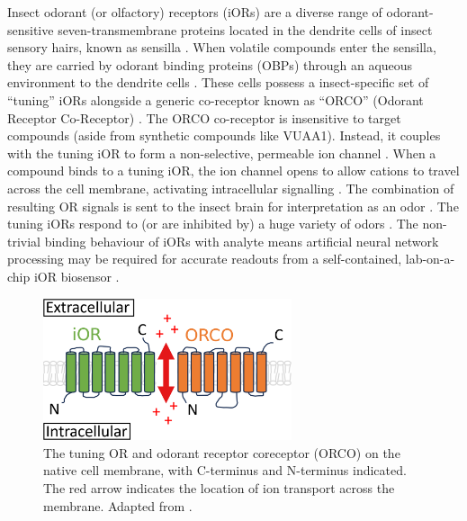 \documentclass[
  a4paper,
]{scrbook}
\begin{document}
Insect odorant (or olfactory) receptors (iORs) are a diverse range of
odorant-sensitive seven-transmembrane proteins located in the dendrite
cells of insect sensory hairs, known as sensilla
\autocite{Clyne1999,Carraher2015,Brito2016,Wicher2021}. When volatile
compounds enter the sensilla, they are carried by odorant binding
proteins (OBPs) through an aqueous environment to the dendrite cells
\autocite{Carraher2015,Brito2016,Wicher2021}. These cells possess a
insect-specific set of ``tuning'' iORs alongside a generic co-receptor
known as ``ORCO'' (Odorant Receptor Co-Receptor)
\autocite{Carraher2015,Butterwick2018,Khadka2019,Wicher2021}. The ORCO
co-receptor is insensitive to target compounds (aside from synthetic
compounds like VUAA1). Instead, it couples with the tuning iOR to form a
non-selective, permeable ion channel
\autocite{Butterwick2018,Wicher2021}. When a compound binds to a tuning
iOR, the ion channel opens to allow cations to travel across the cell
membrane, activating intracellular signalling
\autocite{Smart2008,Wicher2008,Sato2008,Carraher2015,Brito2016,Butterwick2018,Wicher2021}.
The combination of resulting OR signals is sent to the insect brain for
interpretation as an odor \autocite{Hallem2004,Carraher2015,Wicher2021}.
The tuning iORs respond to (or are inhibited by) a huge variety of odors
\autocite{Munch2016}. The non-trivial binding behaviour of iORs with
analyte means artificial neural network processing may be required for
accurate readouts from a self-contained, lab-on-a-chip iOR biosensor
\autocite{Bachtiar2016}.

\begin{figure}

{\centering \includegraphics[width=0.65\textwidth,height=\textheight]{figures/ch3/OR_diagram.png}

}

\caption[The tuning OR and odorant receptor coreceptor (ORCO) on the
native cell membrane, with C-terminus and N-terminus
indicated.]{\label{fig-iOR-membrane}The tuning OR and odorant receptor
coreceptor (ORCO) on the native cell membrane, with C-terminus and
N-terminus indicated. The red arrow indicates the location of ion
transport across the membrane. Adapted from
\autocite{Brito2016,Wicher2021}.}

\end{figure}
\end{document}
